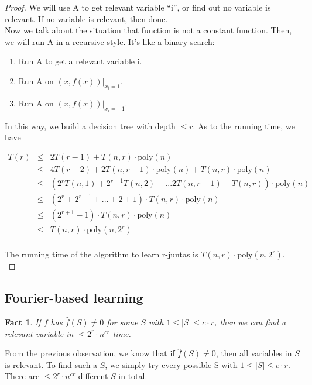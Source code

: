 \documentclass[12pt]{article}
\newtheorem{fact}[theorem]{Fact}
\newcommand{\poly}{\mathrm{poly}}
\begin{document}
\begin{proof}
We will use A to get relevant variable ``i'', or find out no variable
is relevant. If no variable is relevant, then done. \\

Now we talk about the situation that function is not a constant
function. Then, we will run A in a recursive style. It's like a binary
search:

\begin{enumerate}
\item Run A to get a relevant variable i.
\item Run A on $(x, f(x)) |_{x_i = 1}$.
\item Run A on $(x, f(x)) |_{x_i = -1}$.
\end{enumerate}

In this way, we build a decision tree with depth $\le r$. As to the
running time, we have

\begin{eqnarray*}
T(r)
&\le& 2T(r-1) + T(n, r) \cdot \poly (n) \\
&\le& 4T(r-2) + 2T(n, r-1) \cdot \poly (n) + T(n, r) \cdot \poly (n) \\
&\le& (2^rT(n, 1) + 2^{r-1}T(n, 2) + ... 2T(n, r-1) + T(n, r)) \cdot
\poly (n) \\
&\le& (2^r + 2^{r-1} + ... + 2 + 1) \cdot T(n, r) \cdot \poly (n) \\
&\le& (2^{r+1} - 1) \cdot T(n, r) \cdot \poly (n) \\
&\le& T(n, r) \cdot \poly (n, 2^r) \\
\end{eqnarray*}

The running time of the algorithm to learn r-juntas is $T(n,r) \cdot
\poly (n, 2^r)$. \\
\end{proof}

\subsection{Fourier-based learning}

\begin{fact}
If $f$ has $\hat {f}(S) \neq 0$ for some $S$ with $1 \le |S| \le c
\cdot r$, then we can find  a relevant variable in $\le 2^r \cdot
n^{cr}$ time.
\end{fact}

From the previous observation, we know that if $\hat {f}(S) \neq 0$,
then all variables in $S$ is relevant. To find such a $S$, we simply
try every possible S with $1 \le |S| \le c \cdot r$. There are $\le
2^r \cdot n^{cr}$ different $S$ in total. \\
\end{document}
